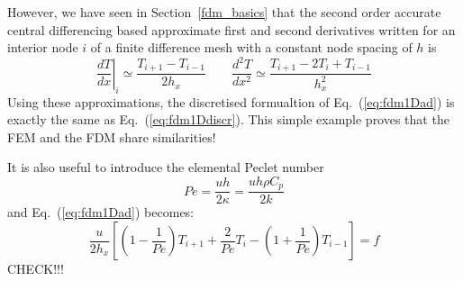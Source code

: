 However, we have seen in Section~\ref{fdm_basics} that the 
second order accurate central differencing based approximate first and second
derivatives written for an interior node $i$ 
of a finite difference mesh with a constant node spacing of $h$ is 
\[
\left. \frac{dT}{dx}\right|_i
\simeq \frac{T_{i+1}-T_{i-1}}{2 h_x}
\qquad
\frac{d^2T}{dx^2} 
\simeq \frac{T_{i+1}-2T_i+T_{i-1}}{h_x^2}
\]
Using these approximations, the discretised formualtion of Eq.~(\ref{eq:fdm1Dad}) is
exactly the same as Eq.~(\ref{eq:fdm1Ddiscr}).
This simple example proves that the FEM and the FDM share similarities!


It is also useful to introduce the elemental Peclet number
\[
Pe = \frac{uh}{2 \kappa} = \frac{u h \rho C_p}{2 k}
\]
and Eq.~(\ref{eq:fdm1Dad}) becomes:
\[
\frac{u}{2h_x}
\left[
\left(1-\frac{1}{Pe}\right) T_{i+1} + \frac{2}{Pe} T_i - \left(1+\frac{1}{Pe}\right)T_{i-1} 
\right] = f
\]
CHECK!!!














